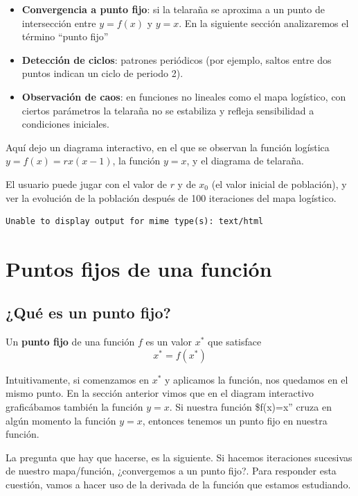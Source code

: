 \documentclass[
  11pt,
  a4paper,
  DIV=11,
  numbers=noendperiod]{scrreprt}
\providecommand{\tightlist}{%
  \setlength{\itemsep}{0pt}\setlength{\parskip}{0pt}}
\begin{document}
\begin{itemize}
\tightlist
\item
  \textbf{Convergencia a punto fijo}: si la telaraña se aproxima a un
  punto de intersección entre \(y=f(x)\) y \(y=x\). En la siguiente
  sección analizaremos el término ``punto fijo''
\item
  \textbf{Detección de ciclos}: patrones periódicos (por ejemplo, saltos
  entre dos puntos indican un ciclo de periodo 2).\\
\item
  \textbf{Observación de caos}: en funciones no lineales como el mapa
  logístico, con ciertos parámetros la telaraña no se estabiliza y
  refleja sensibilidad a condiciones iniciales.
\end{itemize}

Aquí dejo un diagrama interactivo, en el que se observan la función
logística \(y=f(x)=rx(x-1)\), la función \(y = x\), y el diagrama de
telaraña.

El usuario puede jugar con el valor de \(r\) y de \(x_0\) (el valor
inicial de población), y ver la evolución de la población después de 100
iteraciones del mapa logístico.

\begin{verbatim}
Unable to display output for mime type(s): text/html
\end{verbatim}

\chapter{Puntos fijos de una
función}\label{puntos-fijos-de-una-funciuxf3n}

\section{¿Qué es un punto fijo?}\label{quuxe9-es-un-punto-fijo}

Un \textbf{punto fijo} de una función \(f\) es un valor \(x^*\) que
satisface \[x^* = f(x^*)\]

Intuitivamente, si comenzamos en \(x^*\) y aplicamos la función, nos
quedamos en el mismo punto. En la sección anterior vimos que en el
diagram interactivo graficábamos también la función \(y=x\). Si nuestra
función \$f(x)=x'' cruza en algún momento la función \(y=x\), entonces
tenemos un punto fijo en nuestra función.

La pregunta que hay que hacerse, es la siguiente. Si hacemos iteraciones
sucesivas de nuestro mapa/función, ¿convergemos a un punto fijo?. Para
responder esta cuestión, vamos a hacer uso de la derivada de la función
que estamos estudiando.
\end{document}
